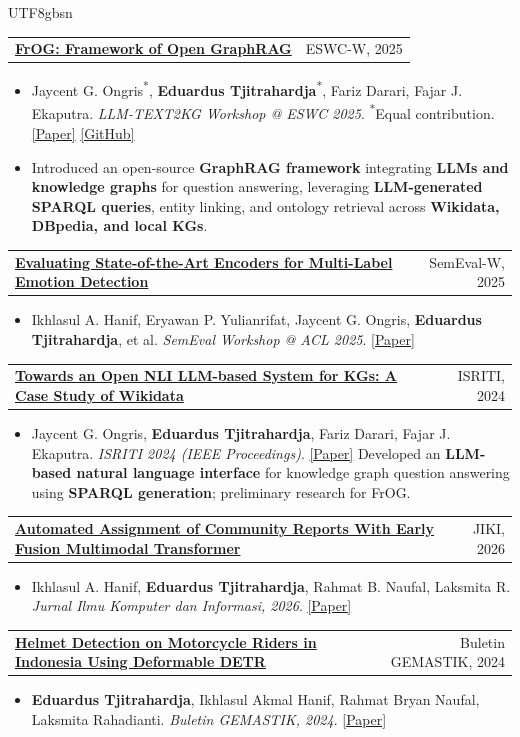 \documentclass[letterpaper,11pt]{article}
\makeatletter
\newcommand{\resumeItem}[1]{
  \item\small{
    {#1 \vspace{0pt}}
  }
}
\newcommand{\resumeProjectHeading}[2]{
    \item
    \begin{tabularx}{\linewidth}{>{\raggedright\arraybackslash}Xr@{}}
      \small#1 & #2 \\
    \end{tabularx}\vspace{0pt}
}
\newcommand{\resumeItemListStart}{\begin{itemize}[itemsep=0pt, parsep=0pt, topsep=0pt]}
\newcommand{\resumeItemListEnd}{\end{itemize}\vspace{0pt}}
\makeatother
\begin{document}
\begin{CJK*}{UTF8}{gbsn}
\resumeProjectHeading
  {\textbf{\href{https://ceur-ws.org/Vol-4020/Paper_ID_7.pdf}{FrOG: Framework of Open GraphRAG}}}{ESWC-W, 2025}
  \resumeItemListStart
    \resumeItem{Jaycent G. Ongris\textsuperscript{*}, \textbf{Eduardus Tjitrahardja}\textsuperscript{*}, Fariz Darari, Fajar J. Ekaputra. \textit{LLM-TEXT2KG Workshop @ ESWC 2025}. \textsuperscript{*}Equal contribution. \href{https://ceur-ws.org/Vol-4020/Paper_ID_7.pdf}{[Paper]} \href{https://github.com/Framework-of-Open-GraphRAG/FROG}{[GitHub]}}
    \resumeItem{Introduced an open-source \textbf{GraphRAG framework} integrating \textbf{LLMs and knowledge graphs} for question answering, leveraging \textbf{LLM-generated SPARQL queries}, entity linking, and ontology retrieval across \textbf{Wikidata, DBpedia, and local KGs}.}
  \resumeItemListEnd


\resumeProjectHeading
  {\textbf{\href{https://aclanthology.org/2025.semeval-1.279/}{Evaluating State-of-the-Art Encoders for Multi-Label Emotion Detection}}}{SemEval-W, 2025}
  \resumeItemListStart
    \resumeItem{Ikhlasul A. Hanif, Eryawan P. Yulianrifat, Jaycent G. Ongris, \textbf{Eduardus Tjitrahardja}, et al. \textit{SemEval Workshop @ ACL 2025}. \href{https://aclanthology.org/2025.semeval-1.279/}{[Paper]}}
  \resumeItemListEnd

\resumeProjectHeading
  {\textbf{\href{https://ieeexplore.ieee.org/document/10963661}{Towards an Open NLI LLM-based System for KGs: A Case Study of Wikidata}}}{ISRITI, 2024}
  \resumeItemListStart
    \resumeItem{Jaycent G. Ongris, \textbf{Eduardus Tjitrahardja}, Fariz Darari, Fajar J. Ekaputra. \textit{ISRITI 2024 (IEEE Proceedings)}. \href{https://ieeexplore.ieee.org/document/10963661}{[Paper]} Developed an \textbf{LLM-based natural language interface} for knowledge graph question answering using \textbf{SPARQL generation}; preliminary research for FrOG.}
  \resumeItemListEnd

\resumeProjectHeading
  {\textbf{\href{https://jiki.cs.ui.ac.id/index.php/jiki/article/view/1426}{Automated Assignment of Community Reports With Early Fusion Multimodal Transformer}}}{JIKI, 2026}
  \resumeItemListStart
    \resumeItem{Ikhlasul A. Hanif, \textbf{Eduardus Tjitrahardja}, Rahmat B. Naufal, Laksmita R. \textit{Jurnal Ilmu Komputer dan Informasi, 2026}. \href{https://doi.org/10.21609/jiki.v19i1.1426}{[Paper]}}
  \resumeItemListEnd

\resumeProjectHeading
  {\textbf{\href{https://buletingemastik.id/index.php/bg/article/view/202404.009}{Helmet Detection on Motorcycle Riders in Indonesia Using Deformable DETR}}}{Buletin GEMASTIK, 2024}
  \resumeItemListStart
    \resumeItem{\textbf{Eduardus Tjitrahardja}, Ikhlasul Akmal Hanif, Rahmat Bryan Naufal, Laksmita Rahadianti. \textit{Buletin GEMASTIK, 2024}. \href{https://buletingemastik.id/index.php/bg/article/view/202404.009}{[Paper]}}
  \resumeItemListEnd


\end{CJK*}
\end{document}
